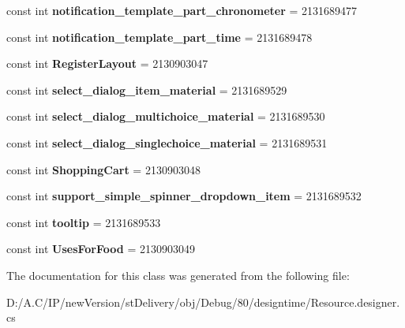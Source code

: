 \begin{DoxyCompactItemize}
\mbox{\label{classst_delivery_1_1_resource_1_1_layout_aa3e2244b08494655646abe2d704a3519}} 
const int {\bfseries notification\+\_\+template\+\_\+part\+\_\+chronometer} = 2131689477
\item 
\mbox{\label{classst_delivery_1_1_resource_1_1_layout_acb050fa343c38f93802138c4931b4636}} 
const int {\bfseries notification\+\_\+template\+\_\+part\+\_\+time} = 2131689478
\item 
\mbox{\label{classst_delivery_1_1_resource_1_1_layout_a0991192b5465e13e1f3be1b2c5cb6a98}} 
const int {\bfseries Register\+Layout} = 2130903047
\item 
\mbox{\label{classst_delivery_1_1_resource_1_1_layout_a3e741a746af2dddc7d13cdc4abe31206}} 
const int {\bfseries select\+\_\+dialog\+\_\+item\+\_\+material} = 2131689529
\item 
\mbox{\label{classst_delivery_1_1_resource_1_1_layout_ac7d5e6b987adf1cee8523dac1dba23a1}} 
const int {\bfseries select\+\_\+dialog\+\_\+multichoice\+\_\+material} = 2131689530
\item 
\mbox{\label{classst_delivery_1_1_resource_1_1_layout_aac96ece068d65b1783ec830b94ac3b78}} 
const int {\bfseries select\+\_\+dialog\+\_\+singlechoice\+\_\+material} = 2131689531
\item 
\mbox{\label{classst_delivery_1_1_resource_1_1_layout_a4e95df21300e9ca59429e485743f3106}} 
const int {\bfseries Shopping\+Cart} = 2130903048
\item 
\mbox{\label{classst_delivery_1_1_resource_1_1_layout_a634bfaa0fe0d23d0e0e67c9155233956}} 
const int {\bfseries support\+\_\+simple\+\_\+spinner\+\_\+dropdown\+\_\+item} = 2131689532
\item 
\mbox{\label{classst_delivery_1_1_resource_1_1_layout_a904eab618f7cd78f18660edc01cf128d}} 
const int {\bfseries tooltip} = 2131689533
\item 
\mbox{\label{classst_delivery_1_1_resource_1_1_layout_a74600c73eefff330e919250a165fea27}} 
const int {\bfseries Uses\+For\+Food} = 2130903049
\end{DoxyCompactItemize}


The documentation for this class was generated from the following file\+:\begin{DoxyCompactItemize}
\item 
D\+:/\+A.\+C/\+I\+P/new\+Version/st\+Delivery/obj/\+Debug/80/designtime/Resource.\+designer.\+cs\end{DoxyCompactItemize}
